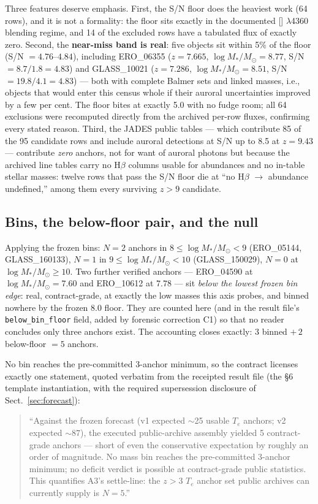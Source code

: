 \documentclass[twocolumn]{aastex702}
\newcommand{\te}{$T_e$}
\newcommand{\logm}{\log M_*/M_\odot}
\begin{document}
Three features deserve emphasis. First, the S/N floor does the heaviest work (64
rows), and it is not a formality: the floor sits exactly in the documented
[] $\lambda$4360 blending regime, and 14 of the excluded rows have a
tabulated flux of exactly zero. Second, the \textbf{near-miss band is real}: five
objects sit within 5\% of the floor (S/N $=4.76$--$4.84$), including ERO\_06355
($z=7.665$, $\logm=8.77$, S/N $=8.7/1.8=4.83$) and GLASS\_10021 ($z=7.286$,
$\logm=8.51$, S/N $=19.8/4.1=4.83$) --- both with complete Balmer sets and linked
masses, i.e., objects that would enter this census whole if their auroral
uncertainties improved by a few per cent. The floor bites at exactly 5.0 with no
fudge room; all 64 exclusions were recomputed directly from the archived
per-row fluxes, confirming every stated reason. Third, the JADES public tables ---
which contribute 85 of the 95 candidate rows and include auroral detections at
S/N up to 8.5 at $z=9.43$ --- contribute \emph{zero} anchors, not for want of
auroral photons but because the archived line tables carry no H$\beta$ columns
usable for abundances and no in-table stellar masses: twelve rows that pass the
S/N floor die at ``no H$\beta$ $\to$ abundance undefined,'' among them every
surviving $z>9$ candidate.

\subsection{Bins, the below-floor pair, and the null}\label{sec:null}

Applying the frozen bins: $N=2$ anchors in $8\leq\logm<9$ (ERO\_05144,
GLASS\_160133), $N=1$ in $9\leq\logm<10$ (GLASS\_150029), $N=0$ at $\logm\geq10$.
Two further verified anchors --- ERO\_04590 at $\logm=7.60$ and ERO\_10612 at
$7.78$ --- sit \emph{below the lowest frozen bin edge}: real, contract-grade, at
exactly the low masses this axis probes, and binned nowhere by the frozen 8.0
floor. They are counted here (and in the result file's
\texttt{below\_bin\_floor} field, added by forensic correction C1) so that no
reader concludes only three anchors exist. The accounting closes exactly:
$3$ binned $+\,2$ below-floor $=5$ anchors.

No bin reaches the pre-committed 3-anchor minimum, so the contract licenses
exactly one statement, quoted verbatim from the receipted result file (the \S6
template instantiation, with the required supersession disclosure of
Sect.~\ref{sec:forecast}):

\begin{quotation}
\noindent``Against the frozen forecast (v1 expected $\sim$25 usable \te{} anchors;
v2 expected $\sim$87), the executed public-archive assembly yielded 5
contract-grade anchors --- short of even the conservative expectation by roughly
an order of magnitude. No mass bin reaches the pre-committed 3-anchor minimum; no
deficit verdict is possible at contract-grade public statistics. This quantifies
A3's settle-line: the $z>3$ \te{} anchor set public archives can currently supply
is $N=5$.''
\end{quotation}
\end{document}
